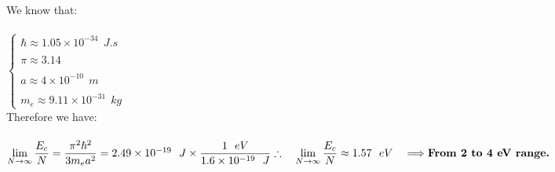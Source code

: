 \documentclass[fleqn]{article}
\begin{document}
\begin{itemize}
      \textcolor{hwColor}{
        We know that: \\
        \\
        $
          \begin{cases}
            \hbar \approx 1.05 \times 10^{-34} ~~ J.s \\
            \\
            \pi \approx 3.14 \\
            \\
            a \approx 4 \times 10^{-10} ~~ m \\
            \\
            m_e \approx 9.11 \times 10^{-31} ~~ kg
          \end{cases}
        $
        \\
        Therefore we have: \\
        \\
        $
          \lim\limits_{N \to \infty} \dfrac{E_c}{N}=\dfrac{\pi^2 \hbar^2}{3m_e a^2}=2.49 \times 10^{-19} ~~ J \times \dfrac{1 ~~ eV}{1.6 \times 10^{-19} ~~ J} \\
          \\
          \\
          \therefore ~~~ \lim\limits_{N \to \infty} \dfrac{E_c}{N} \approx 1.57 ~~ eV ~~~ \Longrightarrow \textbf{From 2 to 4 eV range.}
        $
      }
    
  \end{itemize}


  
\end{document}
